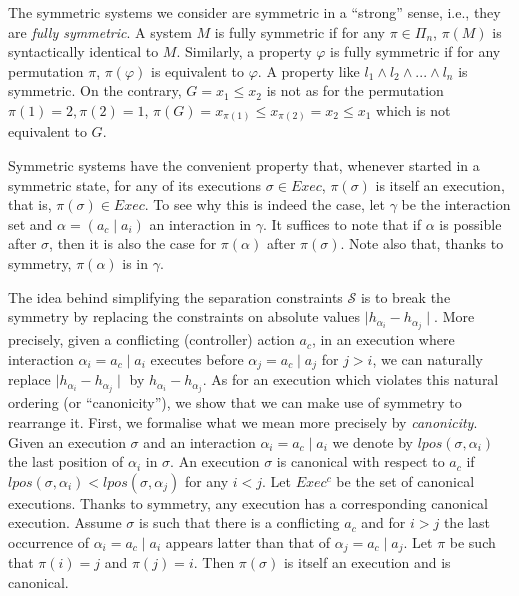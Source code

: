 \documentclass{LMCS}
\newcommand{\sep}{\mathcal{S}}
\newcommand{\exg}{Exec}
\newcommand{\exc}{Exec^{c}}
\newcommand{\mpos}{\mathit{lpos}}
\theoremstyle{plain}\newtheorem{remark}[thm]{Remark}
\theoremstyle{plain}\newtheorem{example}[thm]{Example}
\begin{document}
The symmetric systems we consider are symmetric in a ``strong'' sense,
i.e., they are \textit{fully symmetric}. A system $M$ is fully
symmetric if for any $\pi \in \Pi_n$, $\pi(M)$ is syntactically
identical to $M$.  Similarly, a property $\varphi$ is fully symmetric
if for any permutation $\pi$, $\pi(\varphi)$ is equivalent to
$\varphi$.  A property like $l_1 \wedge l_2 \wedge ... \wedge l_n$ is
symmetric. On the contrary, $G = x_1 \leq x_2$
is not as for the permutation $\pi(1) = 2, \pi(2)=1$, $\pi(G) =
x_{\pi(1)} \leq x_{\pi(2)} = x_2 \leq x_1$ which is not equivalent to
$G$.

Symmetric systems have the convenient property that, whenever started
in a symmetric state, for any of its executions $\sigma \in \exg$,
$\pi(\sigma)$ is itself an execution, that is, $\pi(\sigma) \in
\exg$. To see why this is indeed the case, let $\gamma$ be the
interaction set and $\alpha = (a_c\mid a_i)$ an interaction in
$\gamma$. It suffices to note that if $\alpha$ is possible after
$\sigma$, then it is also the case for $\pi(\alpha)$ after
$\pi(\sigma)$.  Note also that, thanks to symmetry, $\pi(\alpha)$ is
in $\gamma$.

The idea behind simplifying the separation constraints $\sep$ is to
break the symmetry by replacing the constraints on absolute values
$\mid h_{\alpha_i} - h_{\alpha_j} \mid$.  More precisely, given a
conflicting (controller) action $a_c$, in an execution where
interaction $\alpha_i = a_c\mid a_i$ executes before $\alpha_j = a_c
\mid a_j$ for $j > i$, we can naturally replace $\mid h_{\alpha_i} -
h_{\alpha_j}\mid$ by $h_{\alpha_i} - h_{\alpha_j}$.  As for an
execution which violates this natural ordering (or ``canonicity''), we
show that we can make use of symmetry to rearrange it. First, we
formalise what we mean more precisely by \textit{canonicity}.  Given
an execution $\sigma$ and an interaction $\alpha_i = a_c\mid a_i$ we
denote by $\mpos(\sigma, \alpha_i)$ the last position of $\alpha_i$ in
$\sigma$. An execution $\sigma$ is canonical with respect to $a_c$ if
$\mpos(\sigma, \alpha_i) < \mpos(\sigma, \alpha_j)$ for any $i < j$.
Let $\exc$ be the set of canonical executions.  Thanks to symmetry,
any execution has a corresponding canonical execution. Assume $\sigma$
is such that there is a conflicting $a_c$ and for $i > j$ the last
occurrence of $\alpha_i = a_c\mid a_i$ appears latter than that of
$\alpha_j = a_c\mid a_j$. Let $\pi$ be such that $\pi(i) = j$ and
$\pi(j) = i$. Then $\pi(\sigma)$ is itself an execution and is
canonical.
\end{document}
